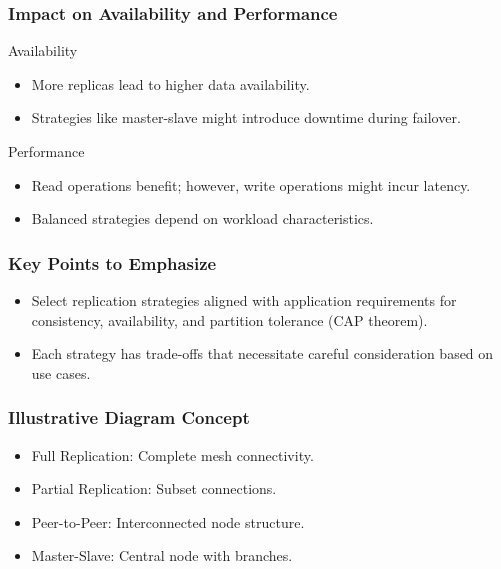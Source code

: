 \documentclass[aspectratio=169]{beamer}
\begin{document}
\begin{frame}[fragile]
    \frametitle{Impact on Availability and Performance}
    \begin{block}{Availability}
        \begin{itemize}
            \item More replicas lead to higher data availability.
            \item Strategies like master-slave might introduce downtime during failover.
        \end{itemize}
    \end{block}
    
    \begin{block}{Performance}
        \begin{itemize}
            \item Read operations benefit; however, write operations might incur latency.
            \item Balanced strategies depend on workload characteristics.
        \end{itemize}
    \end{block}
\end{frame}

\begin{frame}[fragile]
    \frametitle{Key Points to Emphasize}
    \begin{itemize}
        \item Select replication strategies aligned with application requirements for consistency, availability, and partition tolerance (CAP theorem).
        \item Each strategy has trade-offs that necessitate careful consideration based on use cases.
    \end{itemize}
\end{frame}

\begin{frame}[fragile]
    \frametitle{Illustrative Diagram Concept}
    \begin{itemize}
        \item Full Replication: Complete mesh connectivity.
        \item Partial Replication: Subset connections.
        \item Peer-to-Peer: Interconnected node structure.
        \item Master-Slave: Central node with branches.
    \end{itemize}
\end{frame}
\end{document}
